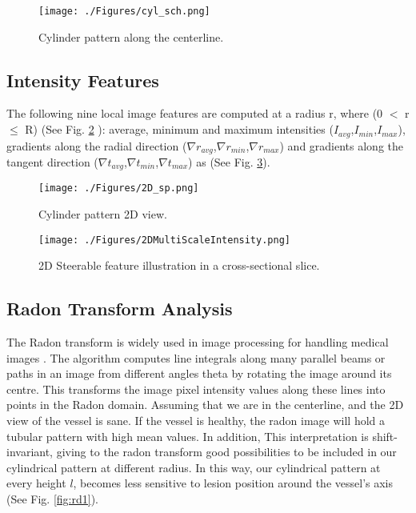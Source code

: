 \begin{figure}[ht]
	\centering
		\texttt{[image: ./Figures/cyl\_sch.png]}
	\caption[Cylinder Pattern]{Cylinder pattern along the centerline.}
	\label{fig:cyl_sch}
\end{figure}


\subsection{Intensity Features}

The following nine local image features are computed at a radius r, where (0 $<$ r $≤$ R) (See Fig. \ref{fig:2d_sp} ): average, minimum and maximum intensities ($I_{avg}$,$I_{min}$,$I_{max}$), gradients along the radial direction ($\nabla r_{avg}$,$\nabla r_{min}$,$\nabla r_{max}$) and gradients along the tangent direction ($\nabla t_{avg}$,$\nabla t_{min}$,$\nabla t_{max}$) as \citep{Mittal2010} (See Fig. \ref{fig:2DMultiScaleIntensity}).

\begin{figure}[ht]
	\centering
		\texttt{[image: ./Figures/2D\_sp.png]}
	\caption[Cylinder Pattern 2D View]{Cylinder pattern 2D view.}
	\label{fig:2d_sp}
\end{figure}

\begin{figure}[ht]
	\centering
		\texttt{[image: ./Figures/2DMultiScaleIntensity.png]}
	\caption[Steerable Feature]{2D Steerable feature illustration in a cross-sectional slice.}
	\label{fig:2DMultiScaleIntensity}
\end{figure}

\subsection{Radon Transform Analysis}

The Radon transform is widely used in image processing for handling medical images \citep{Acharya2013}. The algorithm computes line integrals along many parallel beams or paths in an image from different angles theta by rotating the image around its centre. This transforms the image pixel intensity values along these lines into points in the Radon domain. Assuming that we are in the centerline, and the 2D view of the vessel is sane. If the vessel is healthy, the radon image will hold a tubular pattern with high mean values. In addition, This interpretation is shift-invariant, giving to the radon transform good possibilities to be included in our cylindrical pattern at different radius. In this way, our cylindrical pattern at every height $l$, becomes less sensitive to lesion position around the vessel’s axis (See Fig. \ref{fig:rd1}).

